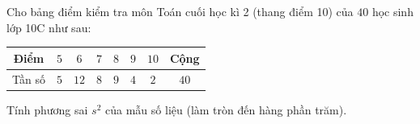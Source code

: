 \begin{ex}
Cho bảng điểm kiểm tra môn Toán cuối học kì 2 (thang điểm 10) của $40$ học sinh lớp 10C như sau:
\begin{center}
\begin{tabular}{|c|c|c|c|c|c|c|c|}\hline
Điểm & $5$ & $6$ & $7$ & $8$ & $9$ & $10$ & Cộng\\\hline
Tần số & $5$ & $12$ & $8$ & $9$ & $4$ & $2$ & $40$\\\hline
\end{tabular}
\end{center}
Tính phương sai $s^2$ của mẫu số liệu (làm tròn đến hàng phần trăm).
\end{ex}
